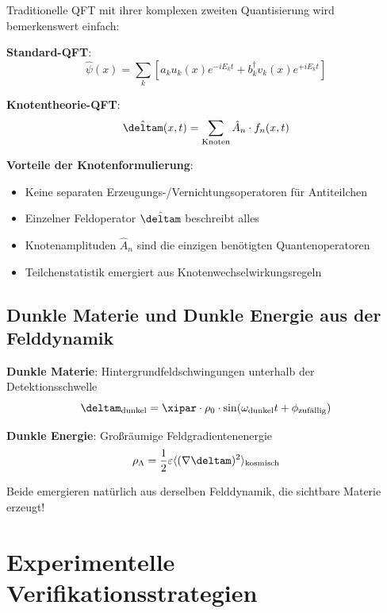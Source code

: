 	Traditionelle QFT mit ihrer komplexen zweiten Quantisierung wird bemerkenswert einfach:
	
	\textbf{Standard-QFT}:
	\begin{equation}
		\hat{\psi}(x) = \sum_k \left[ a_k u_k(x) e^{-iE_k t} + b_k^\dagger v_k(x) e^{+iE_k t} \right]
	\end{equation}
	
	\textbf{Knotentheorie-QFT}:
	\begin{equation}
		\hat{\deltam}(x,t) = \sum_{\text{Knoten}} \hat{A}_n \cdot f_n(x,t)
	\end{equation}
	
	\textbf{Vorteile der Knotenformulierung}:
	\begin{itemize}
		\item Keine separaten Erzeugungs-/Vernichtungsoperatoren für Antiteilchen
		\item Einzelner Feldoperator $\hat{\deltam}$ beschreibt alles
		\item Knotenamplituden $\hat{A}_n$ sind die einzigen benötigten Quantenoperatoren
		\item Teilchenstatistik emergiert aus Knotenwechselwirkungsregeln
	\end{itemize}
	
	\subsection{Dunkle Materie und Dunkle Energie aus der Felddynamik}
	
	\textbf{Dunkle Materie}: Hintergrundfeldschwingungen unterhalb der Detektionsschwelle
	\begin{equation}
		\deltam_{\text{dunkel}} = \xipar \cdot \rho_0 \cdot \sin(\omega_{\text{dunkel}} t + \phi_{\text{zufällig}})
	\end{equation}
	
	\textbf{Dunkle Energie}: Großräumige Feldgradientenenergie
	\begin{equation}
		\rho_{\Lambda} = \frac{1}{2} \varepsilon \langle (\nabla \deltam)^2 \rangle_{\text{kosmisch}}
	\end{equation}
	
	Beide emergieren natürlich aus derselben Felddynamik, die sichtbare Materie erzeugt!
	
	\section{Experimentelle Verifikationsstrategien}
	
